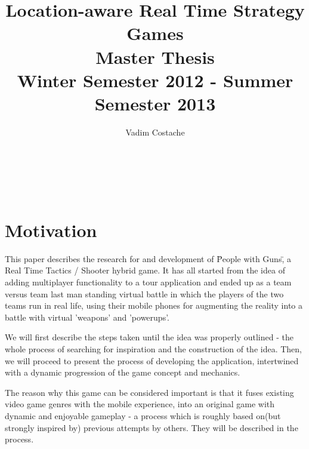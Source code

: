 \documentclass{article}
\title{Location-aware Real Time Strategy Games \\ Master Thesis \\
Winter Semester 2012 - Summer Semester 2013}
\author{Vadim Costache} %
\begin{document}
\maketitle %

\setlength\parindent{0pt} %

\renewcommand{\labelenumi}{\alph{enumi}.} %

\newcommand{\superscript}[1]{\ensuremath{^{\textrm{#1}}}}
\newcommand{\subscript}[1]{\ensuremath{_{\textrm{#1}}}}



   
\begin{verbatim}



\end{verbatim}
     
\tableofcontents

\newpage


\section{Motivation}

This paper describes the research for and development of \"People with Guns\", a
Real Time Tactics / Shooter hybrid game. It has all started from the idea of
adding multiplayer functionality to a tour application and ended up as a team
versus team last man standing virtual battle in which the players of the two
teams run in real life, using their mobile phones for augmenting the reality
into a battle with virtual 'weapons' and 'powerups'.\newline

We will first describe the steps taken until the idea was properly outlined -
the whole process of searching for inspiration and the construction of the idea.
Then, we will proceed to present the process of developing the application,
intertwined with a dynamic progression of the game concept and
mechanics.\newline

The reason why this game can be considered important is that it fuses existing
video game genres with the mobile experience, into an original game with dynamic
and enjoyable gameplay - a process which is roughly based on(but strongly
inspired by) previous attempts by others. They will be described in the
process.\newline
\end{document}
